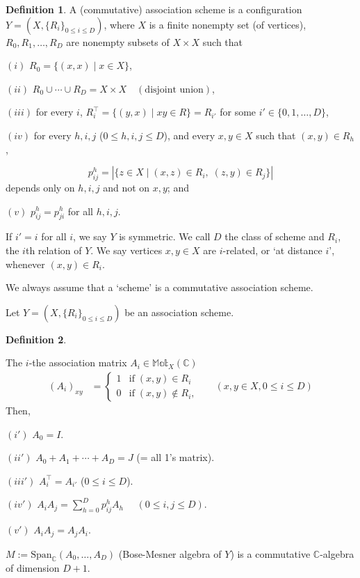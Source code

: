 \documentclass[
]{book}
\theoremstyle{definition}
\newtheorem{definition}{Definition}[chapter]
\theoremstyle{definition}
\theoremstyle{definition}
\theoremstyle{definition}
\theoremstyle{remark}
\begin{document}
\begin{definition}
\protect\hypertarget{def:association-scheme}{}\label{def:association-scheme}A (commutative) association scheme is a configuration \(Y = (X, \{R_i\}_{0\leq i\leq D})\), where \(X\) is a finite nonempty set (of vertices),
\(R_0, R_1, \ldots, R_D\) are nonempty subsets of \(X\times X\) such that

\((i)\) \(R_0 = \{(x,x)\mid x\in X\}\),

\((ii)\) \(R_0 \cup \cdots \cup R_D = X\times X \quad (\text{disjoint union})\),

\((iii)\) for every \(i\), \(R_i^\top = \{(y,x)\mid xy\in R\} = R_{i'}\) for some \(i'\in \{0,1,\ldots, D\}\),

\((iv)\) for every \(h, i, j\) (\(0\leq h, i, j\leq D\)), and every \(x,y\in X\) such that \((x,y)\in R_h\),

\[p^h_{ij} = |\{z\in X\mid (x,z)\in R_i, \; (z,y)\in R_j\}|\]
depends only on \(h, i, j\) and not on \(x,y\); and

\((v)\) \(p^h_{ij} = p^h_{ji}\) for all \(h,i, j\).

If \(i' = i\) for all \(i\), we say \(Y\) is symmetric.
We call \(D\) the class of scheme and \(R_i\), the \(i\)th relation of \(Y\). We say vertices \(x,y\in X\) are \(i\)-related, or `at distance \(i\)', whenever \((x,y)\in R_i\).

We always assume that a `scheme' is a commutative association scheme.
\end{definition}

Let \(Y = (X, \{R_i\}_{0\leq i\leq D})\) be an association scheme.

\begin{definition}
\protect\hypertarget{def:incidencemat-of-as}{}\label{def:incidencemat-of-as}

The \(i\)-the association matrix \(A_i\in \mathbb{Mat}_X(\mathbb{C})\)
\begin{align}
(A_i)_{xy} & = \begin{cases} 1 & \text{if}\; (x,y)\in R_i\\
0 & \text{if}\; (x,y)\not\in R_i,\end{cases} && (x,y\in X, 0\leq i\leq D)
\end{align}
Then,

\((i')\) \(A_0 = I\).

\((ii')\) \(A_0 + A_1 + \cdots + A_D = J\) (= all 1's matrix).

\((iii')\) \(A_i^\top = A_{i'}\) (\(0\leq i\leq D\)).

\((iv')\) \({\displaystyle A_iA_j = \sum_{h=0}^D p^h_{ij}A_h\quad }\) \((0\leq i,j\leq D)\).

\((v')\) \(A_iA_j = A_jA_i\).

\(M := \mathrm{Span}_{\mathbb{C}}(A_0, \ldots, A_D)\) (Bose-Mesner algebra of \(Y\)) is a commutative \(\mathbb{C}\)-algebra of dimension \(D+1\).

\end{definition}
\end{document}
